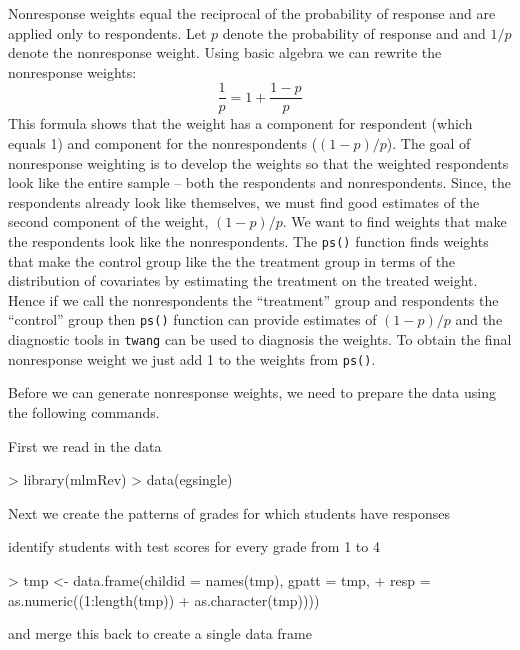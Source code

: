 \documentclass{article}
\begin{document}
Nonresponse weights equal the reciprocal of the probability of
response and are applied only to respondents.  Let $p$ denote the
probability of response and and $1/p$ denote the nonresponse weight.
Using basic algebra we can rewrite the nonresponse weights:
\begin{equation}
\frac{1}{p} = 1 + \frac{1-p}{p} 
\end{equation}
This formula shows that the weight has a component for respondent
(which equals 1) and component for the nonrespondents ($(1-p)/p$).
The goal of nonresponse weighting is to develop the weights so that
the weighted respondents look like the entire sample -- both the
respondents and nonrespondents.  Since, the respondents already look
like themselves, we must find good estimates of the second component
of the weight, $(1-p)/p$.  We want to find weights that make the
respondents look like the nonrespondents.  The \texttt{ps()}
function finds weights that make the control group like the the
treatment group in terms of the distribution of covariates by
estimating the treatment on the treated weight.  Hence if we call
the nonrespondents the ``treatment'' group and respondents the
``control'' group then \texttt{ps()} function can provide estimates
of $(1-p)/p$ and the diagnostic tools in \texttt{twang} can be used
to diagnosis the weights.  To obtain the final nonresponse weight we
just add 1 to the weights from \texttt{ps()}.

Before we can generate nonresponse weights, we need to prepare the
data using the following commands.

First we read in the data

\begin{Schunk}
\begin{Sinput}
> library(mlmRev)
> data(egsingle)
\end{Sinput}
\end{Schunk}

Next we create the patterns of grades for which students have
responses

\begin{Schunk}
\end{Schunk}
identify students with test scores for every grade from 1 to 4

\begin{Schunk}
\begin{Sinput}
> tmp <- data.frame(childid = names(tmp), gpatt = tmp, 
+     resp = as.numeric((1:length(tmp)) %in% grep("1234", 
+         as.character(tmp))))
\end{Sinput}
\end{Schunk}
and merge this back to create a single data frame
\end{document}
